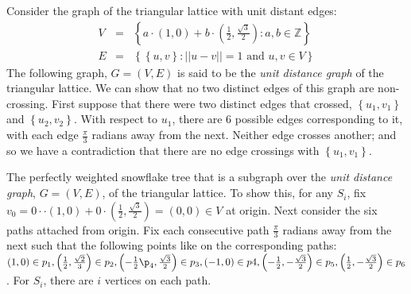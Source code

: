 \documentclass[10pt]{CSUNthesis}
\theoremstyle{plain}%
\theoremstyle{definition}
\theoremstyle{remark}
\newcommand{\bbZ}{{\mathbb{Z}}}
\newcommand{\lr}[1]{\left( #1 \right)}
\begin{document}
Consider the graph of the triangular lattice with unit distant edges:
\begin{eqnarray*}
V &=& \left\lbrace a\cdot (1,0) + b \cdot \left(\frac{1}{2},\frac{\sqrt{3}}{2}\right) : a,b \in \bbZ \right\rbrace\\
E &=& \left\lbrace \left\lbrace u,v \right\rbrace : \vert\vert u-v \vert\vert = 1 \text{ and } u,v \in V\right\rbrace
\end{eqnarray*}
The following graph, $G=(V,E)$ is said to be the \textit{unit distance graph} of the triangular lattice.  
We can show that no two distinct edges of this graph are non-crossing.  
First suppose that there were two distinct edges that crossed, $\left\lbrace u_1,v_1 \right\rbrace $ and $\left\lbrace u_2,v_2 \right\rbrace$.  
With respect to $u_1$, there are 6 possible edges corresponding to it, with each edge $\frac{\pi}{3}$ radians away from the next.  
Neither edge crosses another; and so we have a contradiction that there are no edge crossings with $\left\lbrace u_1,v_1 \right\rbrace $.  


The perfectly weighted snowflake tree that is a subgraph over the \textit{unit distance graph}, $G=(V,E)$, of the triangular lattice.  
To show this, for any $S_i$, fix $v_0 = 0 \cdot \cdot (1,0) + 0 \cdot \left(\frac{1}{2},\frac{\sqrt{3}}{2}\right)=\lr{0,0} \in V$ at origin.  
Next consider the six paths attached from origin.  
Fix each consecutive path $\frac{\pi}{3}$ radians away from the next such that the following points like on the corresponding paths: $\lr{1,0} \in p_1, \lr{\frac{1}{2} ,\frac{\sqrt{2}}{3}} \in p_2,\lr{-\frac{1}{2}\p_4,\frac{\sqrt{3}}{2}} \in p_3, \lr{-1,0} \in p4, \lr{-\frac{1}{2},-\frac{\sqrt{3}}{2}}\in p_5,\lr{\frac{1}{2},-\frac{\sqrt{3}}{2}}\in p_6$.  
For $S_i$, there are $i$ vertices on each path.  
\end{document}
